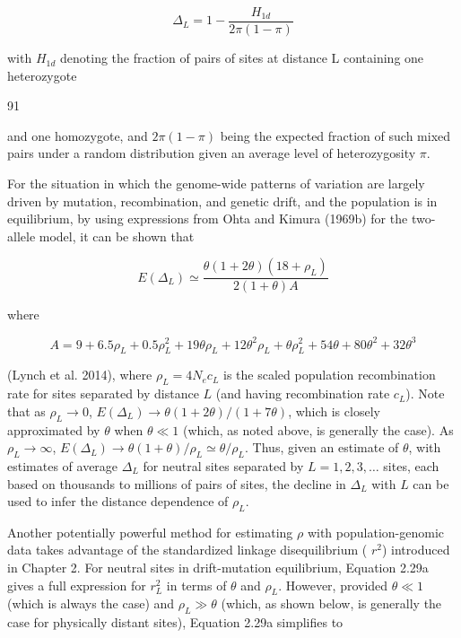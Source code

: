 \documentclass{article}
\begin{document}
\begin{equation}
\Delta_{L}=1-\frac{H_{1d}}{2\pi(1-\pi)}
\tag{4.12}
\label{eq:4_12}
\end{equation}

with  $ H_{1d} $ denoting the fraction of pairs of sites at distance L containing one heterozygote

91

and one homozygote, and  $ 2\pi(1-\pi) $ being the expected fraction of such mixed pairs under a random distribution given an average level of heterozygosity  $ \pi $.

For the situation in which the genome-wide patterns of variation are largely driven by mutation, recombination, and genetic drift, and the population is in equilibrium, by using expressions from Ohta and Kimura (1969b) for the two-allele model, it can be shown that

\begin{equation}
E(\Delta_{L})\simeq\frac{\theta(1+2\theta)(18+\rho_{L})}{2(1+\theta)A}
\tag{4.13a}
\label{eq:4_13a}
\end{equation}

where

\begin{equation}
A=9+6.5\rho_{L}+0.5\rho_{L}^{2}+19\theta\rho_{L}+12\theta^{2}\rho_{L}+\theta\rho_{L}^{2}+54\theta+80\theta^{2}+32\theta^{3}
\tag{4.13b}
\label{eq:4_13b}
\end{equation}

(Lynch et al. 2014), where  $ \rho_L = 4N_e c_L $ is the scaled population recombination rate for sites separated by distance  $ L $ (and having recombination rate  $ c_L $). Note that as  $ \rho_L \to 0 $,  $ E(\Delta_L) \to \theta(1 + 2\theta)/(1 + 7\theta) $, which is closely approximated by  $ \theta $ when  $ \theta \ll 1 $ (which, as noted above, is generally the case). As  $ \rho_L \to \infty $,  $ E(\Delta_L) \to \theta(1 + \theta)/\rho_L \simeq \theta/\rho_L $. Thus, given an estimate of  $ \theta $, with estimates of average  $ \Delta_L $ for neutral sites separated by  $ L = 1, 2, 3, \ldots $ sites, each based on thousands to millions of pairs of sites, the decline in  $ \Delta_L $ with  $ L $ can be used to infer the distance dependence of  $ \rho_L $.

Another potentially powerful method for estimating  $ \rho $ with population-genomic data takes advantage of the standardized linkage disequilibrium ( $ r^2 $) introduced in Chapter 2. For neutral sites in drift-mutation equilibrium, Equation 2.29a gives a full expression for  $ r_L^2 $ in terms of  $ \theta $ and  $ \rho_L $. However, provided  $ \theta \ll 1 $ (which is always the case) and  $ \rho_L \gg \theta $ (which, as shown below, is generally the case for physically distant sites), Equation 2.29a simplifies to
\end{document}
